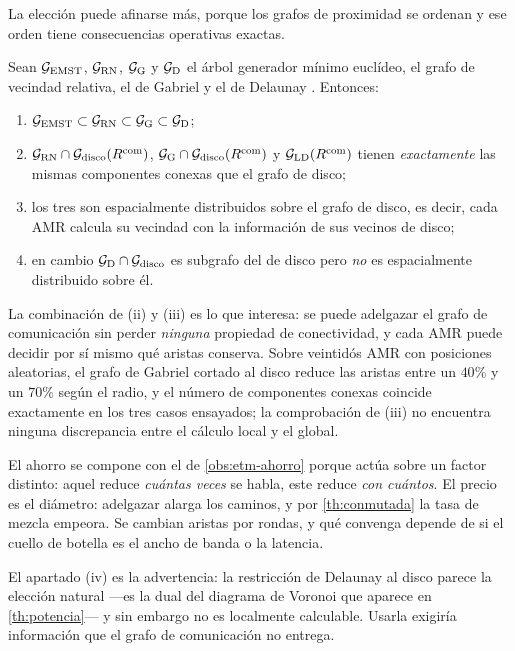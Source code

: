 La elección puede afinarse más, porque los grafos de proximidad se ordenan y ese
orden tiene consecuencias operativas exactas.

\begin{teorema}
\label{th:jerarquia-grafos}
Sean $\mathcal{G}_{\mathrm{EMST}}$, $\mathcal{G}_{\mathrm{RN}}$, $\mathcal{G}_{\mathrm{G}}$ y
$\mathcal{G}_{\mathrm{D}}$ el árbol generador mínimo euclídeo, el grafo de vecindad
relativa, el de Gabriel y el de Delaunay \cite{bullo2009distributed}. Entonces:
\begin{enumerate}[label=(\roman*),leftmargin=2.2em,topsep=0.2em,itemsep=0.15em]
  \item $\mathcal{G}_{\mathrm{EMST}}\subset\mathcal{G}_{\mathrm{RN}}\subset
  \mathcal{G}_{\mathrm{G}}\subset\mathcal{G}_{\mathrm{D}}$;
  \item $\mathcal{G}_{\mathrm{RN}}\cap\mathcal{G}_{\mathrm{disco}}(R^{\mathrm{com}})$,
  $\mathcal{G}_{\mathrm{G}}\cap\mathcal{G}_{\mathrm{disco}}(R^{\mathrm{com}})$ y
  $\mathcal{G}_{\mathrm{LD}}(R^{\mathrm{com}})$ tienen \emph{exactamente} las mismas
  componentes conexas que el grafo de disco;
  \item los tres son espacialmente distribuidos sobre el grafo de disco, es
  decir, cada AMR calcula su vecindad con la información de sus vecinos de
  disco;
  \item en cambio $\mathcal{G}_{\mathrm{D}}\cap\mathcal{G}_{\mathrm{disco}}$ es subgrafo del
  de disco pero \emph{no} es espacialmente distribuido sobre él.
\end{enumerate}
\end{teorema}

\begin{observacion}
\label{obs:esparsificar}
La combinación de (ii) y (iii) es lo que interesa: se puede adelgazar el grafo de
comunicación sin perder \emph{ninguna} propiedad de conectividad, y cada AMR
puede decidir por sí mismo qué aristas conserva. Sobre veintidós AMR con
posiciones aleatorias, el grafo de Gabriel cortado al disco reduce las aristas
entre un $40\%$ y un $70\%$ según el radio, y el número de componentes conexas
coincide exactamente en los tres casos ensayados; la comprobación de (iii) no
encuentra ninguna discrepancia entre el cálculo local y el global.

El ahorro se compone con el de \cref{obs:etm-ahorro} porque actúa sobre un factor
distinto: aquel reduce \emph{cuántas veces} se habla, este reduce \emph{con
cuántos}. El precio es el diámetro: adelgazar alarga los caminos, y por
\cref{th:conmutada} la tasa de mezcla empeora. Se cambian aristas por rondas, y
qué convenga depende de si el cuello de botella es el ancho de banda o la
latencia.

El apartado (iv) es la advertencia: la restricción de Delaunay al disco parece la
elección natural —es la dual del diagrama de Voronoi que aparece en
\cref{th:potencia}— y sin embargo no es localmente calculable. Usarla exigiría
información que el grafo de comunicación no entrega.
\end{observacion}

